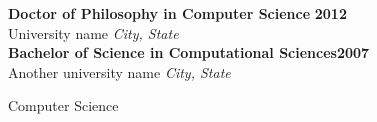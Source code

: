 \curriculumvitae
{
\nobibliography*  %


\textbf{Doctor of Philosophy in Computer Science} \hfill \textbf{2012}\\
University name \hfill \emph{City, State}\\[6pt]
\textbf{Bachelor of Science in Computational Sciences}\hfill\textbf{2007}\\
Another university name \hfill \emph{City, State}









Computer Science




}
